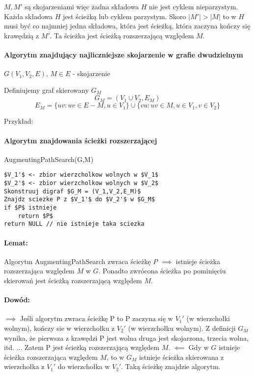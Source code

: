 $M,M'$ są skojarzeniami więc żadna składowa $H$ nie jest cyklem nieparzystym.
Każda składowa $H$ jest ścieżką lub cyklem parzystym. Skoro $|M'| > |M|$ to w $H$ musi być co najmniej jedna składowa, która jest ścieżką, która zaczyna kończy się krawędzią z $M'$. Ta ścieżka jest ścieżką rozszerzającą względem $M$.

\paragraph{Algorytm znajdujący najliczniejsze skojarzenie w grafie dwudzielnym}

$G(V_1, V_2, E)$, $M \in E$ - skojarzenie

Definiujemy graf skierowany $G_M$
$$G_M = (V_1 \cup V_2, E_M)$$ 
$$E_M = \{uv : uv \in E-M, u \in V_1\} \cup \{vu : uv \in M, u \in V_1, v \in V_2\}$$

Przykład:

\paragraph{Algorytm znajdowania ścieżki rozszerzającej}
AugmentingPathSearch(G,M)
\begin{lstlisting}
$V_1'$ <- zbior wierzcholkow wolnych w $V_1$
$V_2'$ <- zbior wierzcholkow wolnych w $V_2$
Skonstruuj digraf $G_M = (V_1,V_2,E_M)$
Znajdz sciezke P z $V_1'$ do $V_2'$ w $G_M$
if $P$ istnieje 
	return $P$
return NULL // nie istnieje taka sciezka
\end{lstlisting}

\paragraph{Lemat:} Algorytm AugmentingPathSearch zwraca ścieżkę $P$ $\implies$ istnieje ścieżka rozszerzająca względem $M$ w $G$. Ponadto zwrócona ścieżka po pominięciu skierowań jest ścieżką rozszerzającą względem $M$.

\paragraph{Dowód:} 
$\implies$ Jeśli algorytm zwraca ścieżkę P to P zaczyna się w $V_1'$ (w wierzchołki wolnym), kończy sie w wierzchołku z $V_2'$ (w wierzchołku wolnym). Z definicji $G_M$ wynika, że pierwsza z krawędzi P jest wolna druga jest skojarzona, trzecia wolna, itd.  ... Zatem P jest ścieżką rozszerzającą względem $M$.
$\impliedby$ Gdy w $G$ istnieje ścieżka rozszerzająca względem $M$, to w $G_M$ istnieje ścieżka skierowana z wierzchołka z $V_1'$ do wierzchołka w $V_2'$. Taką ścieżkę znajdzie algorytm.


